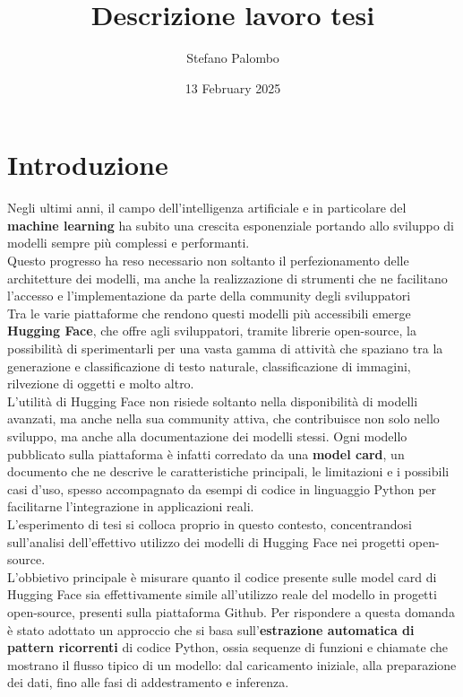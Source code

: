 \documentclass{article}
\title{Descrizione lavoro tesi}
\author{Stefano Palombo}
\date{13 February 2025}
\begin{document}
\maketitle

\section{Introduzione}
Negli ultimi anni, il campo dell'intelligenza artificiale e in particolare del \textbf{machine learning} ha subito una crescita esponenziale portando allo sviluppo di modelli sempre più complessi e performanti.\\
Questo progresso ha reso necessario non soltanto il perfezionamento delle architetture dei modelli, ma anche la realizzazione di strumenti che ne facilitano l'accesso e l'implementazione da parte della community degli sviluppatori\\
Tra le varie piattaforme che rendono questi modelli più accessibili emerge \textbf{Hugging Face}, che offre agli sviluppatori, tramite librerie open-source, la possibilità di sperimentarli per una vasta gamma di attività che spaziano tra la generazione e classificazione di testo naturale, classificazione di immagini, rilvezione di oggetti e molto altro.\\
L'utilità di Hugging Face non risiede soltanto nella disponibilità di modelli avanzati, ma anche nella sua community attiva, che contribuisce non solo nello sviluppo, ma anche alla documentazione dei modelli stessi. Ogni modello pubblicato sulla piattaforma è infatti corredato da una \textbf{model card}, un documento che ne descrive le caratteristiche principali, le limitazioni e i possibili casi d’uso, spesso accompagnato da esempi di codice in linguaggio Python per facilitarne l’integrazione in applicazioni reali.\\
L'esperimento di tesi si colloca proprio in questo contesto, concentrandosi sull’analisi dell’effettivo utilizzo dei modelli di Hugging Face nei progetti open-source.\\
L'obbietivo principale è misurare quanto il codice presente sulle model card di Hugging Face sia effettivamente simile all'utilizzo reale del modello in progetti open-source, presenti sulla piattaforma Github. Per rispondere a questa domanda è stato adottato un approccio che si basa sull'\textbf{estrazione automatica di pattern ricorrenti} di codice Python, ossia sequenze di funzioni e chiamate che mostrano il flusso tipico di un modello: dal caricamento iniziale, alla preparazione dei dati, fino alle fasi di addestramento e inferenza.\\
\end{document}
